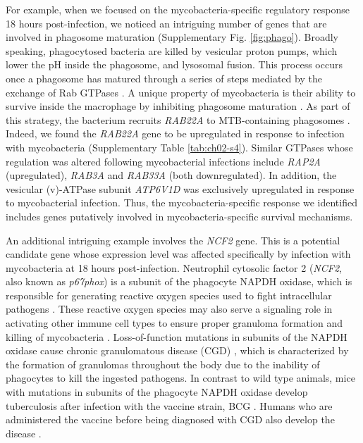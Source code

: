 For example, when we focused on the mycobacteria-specific regulatory
response 18 hours post-infection, we noticed an intriguing number of
genes that are involved in phagosome maturation (Supplementary
Fig. \ref{fig:phago}). Broadly speaking, phagocytosed bacteria are
killed by vesicular proton pumps, which lower the pH inside the
phagosome, and lysosomal fusion. This process occurs once a phagosome
has matured through a series of steps mediated by the exchange of Rab
GTPases \citep{Vergne2004, Mortellaro2009}. A unique property of
mycobacteria is their ability to survive inside the macrophage by
inhibiting phagosome maturation \citep{Hestvik2005}. As part of this
strategy, the bacterium recruits \emph{RAB22A} to MTB-containing
phagosomes \citep{Roberts2006}. Indeed, we found the \emph{RAB22A}
gene to be upregulated in response to infection with mycobacteria
(Supplementary Table \ref{tab:ch02-s4}). Similar GTPases whose
regulation was altered following mycobacterial infections include
\emph{RAP2A} (upregulated), \emph{RAB3A} and \emph{RAB33A} (both
downregulated). In addition, the vesicular (v)-ATPase subunit
\emph{ATP6V1D} was exclusively upregulated in response to
mycobacterial infection. Thus, the mycobacteria-specific response we
identified includes genes putatively involved in mycobacteria-specific
survival mechanisms.

An additional intriguing example involves the \emph{NCF2} gene. This
is a potential candidate gene whose expression level was affected
specifically by infection with mycobacteria at 18 hours
post-infection.  Neutrophil cytosolic factor 2 (\emph{NCF2}, also
known as \emph{p67phox}) is a subunit of the phagocyte NAPDH oxidase,
which is responsible for generating reactive oxygen species used to
fight intracellular pathogens \citep{Ehrt2001, Myers2003, Babior2004,
  Bustamante2011, Kim2011c, Deffert2014}. These reactive oxygen
species may also serve a signaling role in activating other immune
cell types to ensure proper granuloma formation and killing of
mycobacteria \citep{Deffert2014a}. Loss-of-function mutations in
subunits of the NAPDH oxidase cause chronic granulomatous disease
(CGD) \citep{Deffert2014}, which is characterized by the formation of
granulomas throughout the body due to the inability of phagocytes to
kill the ingested pathogens.  In contrast to wild type animals, mice
with mutations in subunits of the phagocyte NAPDH oxidase develop
tuberculosis after infection with the vaccine strain, BCG
\citep{Deffert2014a}. Humans who are administered the vaccine before
being diagnosed with CGD also develop the disease \citep{Deffert2014}.

